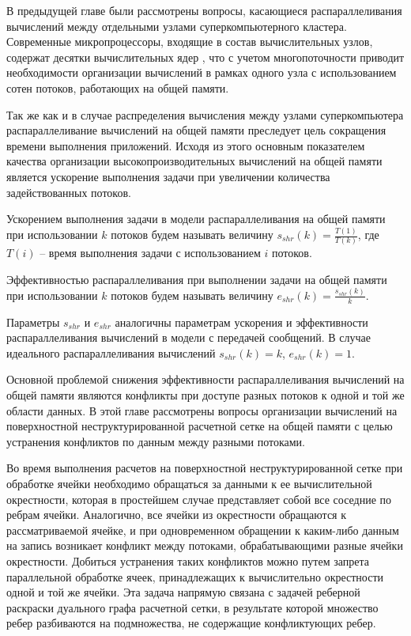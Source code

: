 В предыдущей главе были рассмотрены вопросы, касающиеся распараллеливания вычислений между отдельными узлами суперкомпьютерного кластера.
Современные микропроцессоры, входящие в состав вычислительных узлов, содержат десятки вычислительных ядер \cite{Section3IntroIntel,Section3IntroAMD,Kuzminsky2022ARM}, что с учетом многопоточности приводит необходимости организации вычислений в рамках одного узла с использованием сотен потоков, работающих на общей памяти.

Так же как и в случае распределения вычисления между узлами суперкомпьютера распараллеливание вычислений на общей памяти преследует цель сокращения времени выполнения приложений.
Исходя из этого основным показателем качества организации высокопроизводительных вычислений на общей памяти является ускорение выполнения задачи при увеличении количества задействованных потоков.

\begin{definition}
Ускорением выполнения задачи в модели распараллеливания на общей памяти\label{term:shr_speedup} при использовании $k$ потоков будем называть величину $s_{shr}(k) = \frac{T(1)}{T(k)}$, где $T(i)$ -- время выполнения задачи с использованием $i$ потоков.
\end{definition}

\begin{definition}
Эффективностью распараллеливания при выполнении задачи на общей памяти\label{term:shr_eff} при использовании $k$ потоков будем называть величину $e_{shr}(k) = \frac{s_{shr}(k)}{k}$.
\end{definition}

Параметры $s_{shr}$ и $e_{shr}$ аналогичны параметрам ускорения\label{term:msg_speedup3} и эффективности\label{term:msg_eff3} распараллеливания вычислений в модели с передачей сообщений.
В случае идеального распараллеливания вычислений $s_{shr}(k) = k$, $e_{shr}(k) = 1$.

Основной проблемой снижения эффективности распараллеливания вычислений на общей памяти являются конфликты при доступе разных потоков к одной и той же области данных.
В этой главе рассмотрены вопросы организации вычислений на поверхностной неструктурированной расчетной сетке\label{term:unstruct_surf_calc_mesh6} на общей памяти с целью устранения конфликтов по данным между разными потоками.

Во время выполнения расчетов на поверхностной неструктурированной сетке при обработке ячейки необходимо обращаться за данными к ее вычислительной окрестности\label{term:cell_calc_template3}, которая в простейшем случае представляет собой все соседние по ребрам ячейки.
Аналогично, все ячейки из окрестности обращаются к рассматриваемой ячейке, и при одновременном обращении к каким-либо данным на запись возникает конфликт между потоками, обрабатывающими разные ячейки окрестности.
Добиться устранения таких конфликтов можно путем запрета параллельной обработке ячеек, принадлежащих к вычислительно окрестности одной и той же ячейки.
Эта задача напрямую связана с задачей реберной раскраски дуального графа расчетной сетки, в результате которой множество ребер разбиваются на подмножества, не содержащие конфликтующих ребер.

